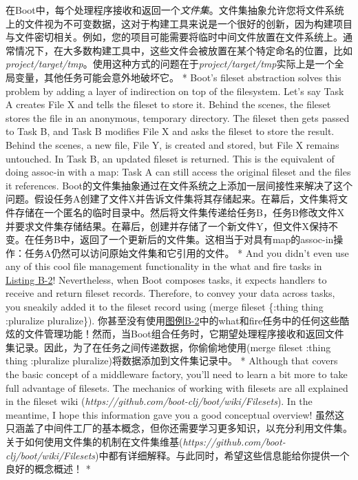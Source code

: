 \begin{paracol}{2}
\switchcolumn
在Boot中，每个处理程序接收和返回一个\emph{文件集}。文件集抽象允许您将文件系统上的文件视为不可变数据，这对于构建工具来说是一个很好的创新，因为构建项目与文件密切相关。例如，您的项目可能需要将临时中间文件放置在文件系统上。通常情况下，在大多数构建工具中，这些文件会被放置在某个特定命名的位置，比如\emph{project/target/tmp}。使用这种方式的问题在于\emph{project/target/tmp}实际上是一个全局变量，其他任务可能会意外地破坏它。
\switchcolumn[0]*
Boot's fileset abstraction solves this problem by adding a layer of
indirection on top of the filesystem. Let's say Task A creates File X
and tells the fileset to store it. Behind the scenes, the fileset stores
the file in an anonymous, temporary directory. The fileset then gets
passed to Task B, and Task B modifies File X and asks the fileset to
store the result. Behind the scenes, a new file, File Y, is created and
stored, but File X remains untouched. In Task B, an updated fileset is
returned. This is the equivalent of doing assoc-in with a map: Task A
can still access the original fileset and the files it references.
\switchcolumn
Boot的文件集抽象通过在文件系统之上添加一层间接性来解决了这个问题。假设任务A创建了文件X并告诉文件集将其存储起来。在幕后，文件集将文件存储在一个匿名的临时目录中。然后将文件集传递给任务B，任务B修改文件X并要求文件集存储结果。在幕后，创建并存储了一个新文件Y，但文件X保持不变。在任务B中，返回了一个更新后的文件集。这相当于对具有map的assoc-in操作：任务A仍然可以访问原始文件集和它引用的文件。
\switchcolumn[0]*
And you didn't even use any of this cool file management functionality
in the what and fire tasks in \href{javascript:void(0)}{Listing B-2}!
Nevertheless, when Boot composes tasks, it expects handlers to receive
and return fileset records. Therefore, to convey your data across tasks,
you sneakily added it to the fileset record using (merge fileset
\{:thing thing :pluralize pluralize\}).
\switchcolumn
你甚至没有使用\href{javascript:void(0)}{图例B-2}中的what和fire任务中的任何这些酷炫的文件管理功能！然而，当Boot组合任务时，它期望处理程序接收和返回文件集记录。因此，为了在任务之间传递数据，你偷偷地使用(merge fileset {:thing thing :pluralize pluralize})将数据添加到文件集记录中。
\switchcolumn[0]*
Although that covers the basic concept of a middleware factory, you'll
need to learn a bit more to take full advantage of filesets. The
mechanics of working with filesets are all explained in the fileset wiki
(\emph{https://github.com/boot-clj/boot/wiki/Filesets}). In the
meantime, I hope this information gave you a good conceptual overview!
\switchcolumn
虽然这只涵盖了中间件工厂的基本概念，但你还需要学习更多知识，以充分利用文件集。关于如何使用文件集的机制在文件集维基(\emph{https://github.com/boot-clj/boot/wiki/Filesets})中都有详细解释。与此同时，希望这些信息能给你提供一个良好的概念概述！
\switchcolumn[0]*

\end{paracol}
